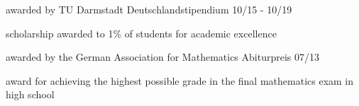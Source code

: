 



\begin{cvhonors}

  \cventry
    {awarded by TU Darmstadt} %
    {Deutschlandstipendium} %
    {} %
    {10/15 - 10/19} %
    {
      \begin{cvitems} %
        \item {scholarship awarded to 1\% of students for academic excellence}
      \end{cvitems}
    }
    
  \cventry
    {awarded by the German Association for Mathematics} %
    {Abiturpreis} %
    {} %
    {07/13} %
    {
      \begin{cvitems} %
        \item {award for achieving the highest possible grade in the final mathematics exam in high school}
      \end{cvitems}
    }


\end{cvhonors}
